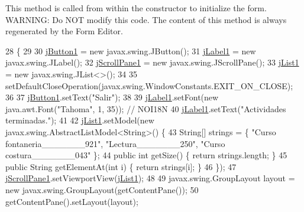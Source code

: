 This method is called from within the constructor to initialize the form. W\+A\+R\+N\+I\+NG\+: Do N\+OT modify this code. The content of this method is always regenerated by the Form Editor. 
\begin{DoxyCode}
28                                   \{
29 
30         \mbox{\hyperlink{classsoftware_1_1parasoftware7_ad1649be57f87718bce210a36a2b5a8c3}{jButton1}} = \textcolor{keyword}{new} javax.swing.JButton();
31         \mbox{\hyperlink{classsoftware_1_1parasoftware7_acf4de3dce9e1861b004011df14fb9d06}{jLabel1}} = \textcolor{keyword}{new} javax.swing.JLabel();
32         \mbox{\hyperlink{classsoftware_1_1parasoftware7_a7579f4ce7f3b0e82e4aa3ea603dc6307}{jScrollPane1}} = \textcolor{keyword}{new} javax.swing.JScrollPane();
33         \mbox{\hyperlink{classsoftware_1_1parasoftware7_adb21c8ddcb260404d3b07d8af04c655e}{jList1}} = \textcolor{keyword}{new} javax.swing.JList<>();
34 
35         setDefaultCloseOperation(javax.swing.WindowConstants.EXIT\_ON\_CLOSE);
36 
37         \mbox{\hyperlink{classsoftware_1_1parasoftware7_ad1649be57f87718bce210a36a2b5a8c3}{jButton1}}.setText(\textcolor{stringliteral}{"Salir"});
38 
39         \mbox{\hyperlink{classsoftware_1_1parasoftware7_acf4de3dce9e1861b004011df14fb9d06}{jLabel1}}.setFont(\textcolor{keyword}{new} java.awt.Font(\textcolor{stringliteral}{"Tahoma"}, 1, 35)); \textcolor{comment}{// NOI18N}
40         \mbox{\hyperlink{classsoftware_1_1parasoftware7_acf4de3dce9e1861b004011df14fb9d06}{jLabel1}}.setText(\textcolor{stringliteral}{"Actividades terminadas."});
41 
42         \mbox{\hyperlink{classsoftware_1_1parasoftware7_adb21c8ddcb260404d3b07d8af04c655e}{jList1}}.setModel(\textcolor{keyword}{new} javax.swing.AbstractListModel<String>() \{
43             String[] strings = \{ \textcolor{stringliteral}{"Curso fontaneria\_\_\_\_\_\_\_921"}, \textcolor{stringliteral}{"Lectura\_\_\_\_\_\_\_250"}, \textcolor{stringliteral}{"Curso
       costura\_\_\_\_\_\_\_043"} \};
44             \textcolor{keyword}{public} \textcolor{keywordtype}{int} getSize() \{ \textcolor{keywordflow}{return} strings.length; \}
45             \textcolor{keyword}{public} String getElementAt(\textcolor{keywordtype}{int} i) \{ \textcolor{keywordflow}{return} strings[i]; \}
46         \});
47         \mbox{\hyperlink{classsoftware_1_1parasoftware7_a7579f4ce7f3b0e82e4aa3ea603dc6307}{jScrollPane1}}.setViewportView(\mbox{\hyperlink{classsoftware_1_1parasoftware7_adb21c8ddcb260404d3b07d8af04c655e}{jList1}});
48 
49         javax.swing.GroupLayout layout = \textcolor{keyword}{new} javax.swing.GroupLayout(getContentPane());
50         getContentPane().setLayout(layout);

\end{DoxyCode}
